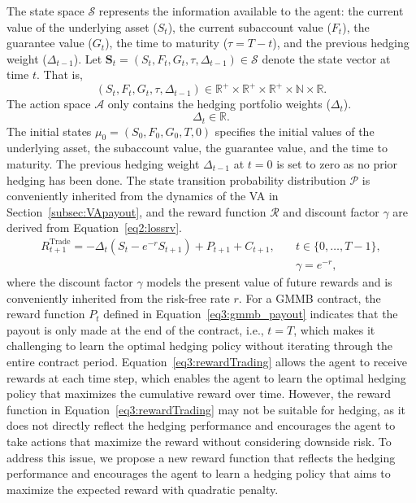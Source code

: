 The state space $\mathcal{S}$ represents the information available to the agent: the current value of the underlying asset ($S_t$), the current subaccount value ($F_t$), the guarantee value ($G_t$), the time to maturity ($\tau = T-t$), and the previous hedging weight ($\Delta_{t-1}$). 
Let $\mathbf{S}_t = (S_t, F_t, G_t, \tau, \Delta_{t-1}) \in \mathcal{S} $ denote the state vector at time $t$.
That is,
$$
    (S_t, F_t, G_t, \tau, \Delta_{t-1})  \in \mathbb{R}^+ \times \mathbb{R}^+ \times \mathbb{R}^+ \times \mathbb{N} \times \mathbb{R}.
$$
The action space $\mathcal{A}$ only contains the hedging portfolio weights ($\Delta_t$).
$$
    \Delta_t \in \mathbb{R}.
$$
The initial states $\mu_0 = (S_0, F_0, G_0, T, 0)$ specifies the initial values of the underlying asset, the subaccount value, the guarantee value, and the time to maturity. 
The previous hedging weight $\Delta_{t-1}$ at $t=0$ is set to zero as no prior hedging has been done.
The state transition probability distribution $\mathcal{P}$ is conveniently inherited from the dynamics of the VA in Section~\ref{subsec:VApayout}, and the reward function $\mathcal{R}$ and discount factor $\gamma$ are derived from Equation~\ref{eq2:lossrv}.
\begin{align} \label{eq3:rewardTrading}
    R_{t+1}^{\text{Trade}} = -\Delta_t (S_t - e^{-r}S_{t+1}) + P_{t+1} + C_{t+1}, \quad & t \in \{0,\ldots,T-1\}, \\
    & \gamma  = e^{-r}, \nonumber
\end{align}
where the discount factor $\gamma$ models the present value of future rewards and is conveniently inherited from the risk-free rate $r$. 
For a GMMB contract, the reward function $P_t$ defined in Equation~\ref{eq3:gmmb_payout} indicates that the payout is only made at the end of the contract, i.e., $t=T$, which makes it challenging to learn the optimal hedging policy without iterating through the entire contract period.
Equation~\ref{eq3:rewardTrading} allows the agent to receive rewards at each time step, which enables the agent to learn the optimal hedging policy that maximizes the cumulative reward over time.
However, the reward function in Equation~\ref{eq3:rewardTrading} may not be suitable for hedging, as it does not directly reflect the hedging performance and encourages the agent to take actions that maximize the reward without considering downside risk.
To address this issue, we propose a new reward function that reflects the hedging performance and encourages the agent to learn a hedging policy that aims to maximize the expected reward with quadratic penalty.

